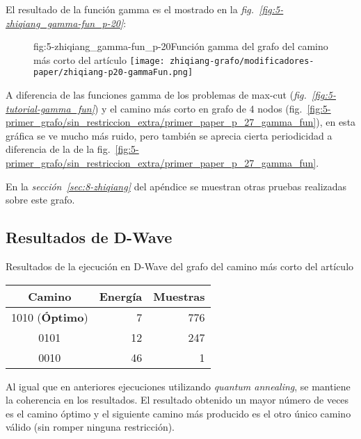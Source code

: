 El resultado de la función gamma es el mostrado en la \textit{fig.~\ref{fig:5-zhiqiang_gamma-fun_p-20}}:

\begin{figure}[Resultados QAOA {--} artículo de Fan et al. (2023){--} función gamma para $P = 20$]{fig:5-zhiqiang_gamma-fun_p-20}{Función gamma del grafo del camino más corto del artículo\cite{solving_shortest_path_with_qaoa}}
  \centering
  \texttt{[image: zhiqiang-grafo/modificadores-paper/zhiqiang-p20-gammaFun.png]}
\end{figure}

A diferencia de las funciones gamma de los problemas de max-cut (\textit{fig.~\ref{fig:5-tutorial-gamma_fun}}) y el camino más corto en grafo de 4 nodos (fig.~\ref{fig:5-primer_grafo/sin_restriccion_extra/primer_paper_p_27_gamma_fun}), en esta gráfica se ve mucho más ruido, pero también se aprecia cierta periodicidad a diferencia de la de la fig.~\ref{fig:5-primer_grafo/sin_restriccion_extra/primer_paper_p_27_gamma_fun}.

En la \textit{sección~\ref{sec:8-zhiqiang}} del apéndice se muestran otras pruebas realizadas sobre este grafo.

\subsection{Resultados de D-Wave}
\begin{table}[Resultados D-Wave {--} artículo de Fan et al. (2023)]{}{Resultados de la ejecución en D-Wave del grafo del camino más corto del artículo\cite{solving_shortest_path_with_qaoa}}
  \centering
  \begin{tabular}{|c|r|r|}
    \hline
    \textbf{Camino}        & \textbf{Energía} & \textbf{Muestras} \\ \hline
    1010 (\textbf{Óptimo}) &  7               & 776               \\ \hline
    0101                   & 12               & 247               \\ \hline
    0010                   & 46               &   1               \\ \hline
  \end{tabular}
\end{table}

Al igual que en anteriores ejecuciones utilizando \textit{quantum annealing}, se mantiene la coherencia en los resultados. El resultado obtenido un mayor número de veces es el camino óptimo y el siguiente camino más producido es el otro único camino válido (sin romper ninguna restricción).

